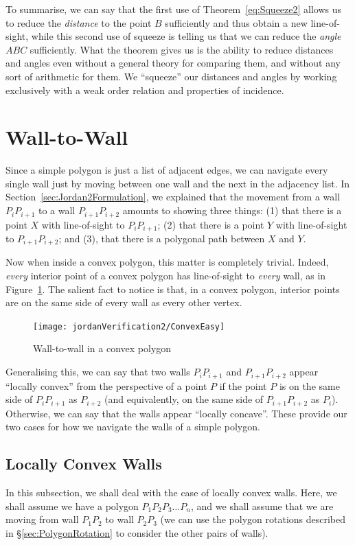To summarise, we can say that the first use of Theorem~\ref{eq:Squeeze2} allows us to reduce the \emph{distance} to the point $B$ sufficiently and thus obtain a new line-of-sight, while this second use of squeeze is telling us that we can reduce the \emph{angle} $ABC$ sufficiently. What the theorem gives us is the ability to reduce distances and angles even without a general theory for comparing them, and without any sort of arithmetic for them. We ``squeeze'' our distances and angles by working exclusively with a weak order relation and properties of incidence.

\section{Wall-to-Wall}\label{sec:NavigationVerification}
Since a simple polygon is just a list of adjacent edges, we can navigate every single wall just by moving between one wall and the next in the adjacency list. In Section~\ref{sec:Jordan2Formulation}, we explained that the movement from a wall $P_{i}P_{i+1}$ to a wall $P_{i+1}P_{i+2}$ amounts to showing three things: (1) that there is a point $X$ with line-of-sight to $P_{i}P_{i+1}$; (2) that there is a point $Y$ with line-of-sight to $P_{i+1}P_{i+2}$; and (3), that there is a polygonal path between $X$ and $Y$.

Now when inside a convex polygon, this matter is completely trivial. Indeed, \emph{every} interior point of a convex polygon has line-of-sight to \emph{every} wall, as in Figure~\ref{fig:ConvexEasy}. The salient fact to notice is that, in a convex polygon, interior points are on the same side of every wall as every other vertex. 

\begin{figure}
\centering\texttt{[image: jordanVerification2/ConvexEasy]}
\caption{Wall-to-wall in a convex polygon}
\label{fig:ConvexEasy}
\end{figure}

Generalising this, we can say that two walls $P_{i}P_{i+1}$ and $P_{i+1}P_{i+2}$ appear ``locally convex'' from the perspective of a point $P$ if the point $P$ is on the same side of $P_{i}P_{i+1}$ as $P_{i+2}$ (and equivalently, on the same side of $P_{i+1}P_{i+2}$ as $P_{i}$). Otherwise, we can say that the walls appear ``locally concave''. These provide our two cases for how we navigate the walls of a simple polygon.

\subsection{Locally Convex Walls}\label{sec:ConcaveMove}
In this subsection, we shall deal with the case of locally convex walls. Here, we shall assume we have a polygon $P_1P_2P_3\ldots P_n$, and we shall assume that we are moving from wall $P_1P_2$ to wall $P_2P_3$ (we can use the polygon rotations described in \S\ref{sec:PolygonRotation} to consider the other pairs of walls).

